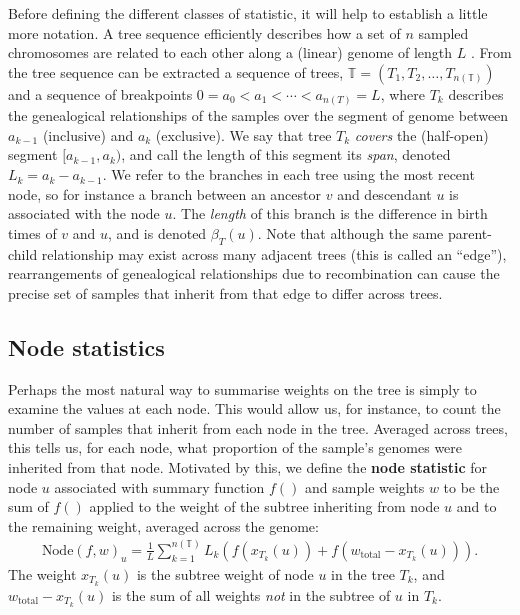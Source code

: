 \documentclass{article}
\newcommand{\node}{\mbox{Node}} %
\newcommand{\treeseq}{\mathbb{T}} %
\newcommand{\iw}{w} %
\newcommand{\tiw}{w_\text{total}} %
\newcommand{\nw}{x} %
\begin{document}
Before defining the different classes of statistic,
it will help to establish a little more notation.
A tree sequence efficiently describes how a set of $n$ sampled chromosomes
are related to each other along a (linear) genome of length $L$ \citep{kelleher2016efficient,kelleher2018efficient}.
From the tree sequence can be extracted a sequence of trees,
$\treeseq = (T_1, T_2, \ldots, T_{n(\treeseq)})$
and a sequence of breakpoints $0 = a_0 < a_1 < \cdots < a_{n(T)} = L$,
where $T_k$ describes the genealogical relationships of the samples
over the segment of genome between $a_{k-1}$ (inclusive) and $a_k$ (exclusive).
We say that tree $T_k$ \emph{covers} the (half-open) segment $[a_{k-1}, a_k)$,
and call the length of this segment its \emph{span}, denoted $L_k = a_k - a_{k-1}$.
We refer to the branches in each tree using the most recent node,
so for instance a branch between an ancestor $v$ and descendant $u$
is associated with the node $u$.
The \emph{length} of this branch is the difference in birth times of $v$ and $u$,
and is denoted $\beta_T(u)$.
Note that although the same parent-child relationship may exist across many adjacent trees
(this is called an ``edge''),
rearrangements of genealogical relationships due to recombination
can cause the precise set of samples that inherit from that edge to differ across trees.


\subsection*{Node statistics}

Perhaps the most natural way to summarise weights on the tree
is simply to examine the values at each node.
This would allow us, for instance, to
count the number of samples that inherit from each node in the tree.
Averaged across trees,
this tells us, for each node, what proportion of the sample's genomes were inherited from that node.
Motivated by this, we define the
\textbf{node statistic} for node $u$
associated with summary function $f()$ and sample weights $\iw$
to be the sum of $f()$ applied to the weight of the subtree inheriting from node $u$
and to the remaining weight,
averaged across the genome:
\begin{align}
    \node(f, \iw)_u
    =
    \frac{1}{L} \sum_{k=1}^{n(\treeseq)} L_k \left( f(\nw_{T_k}(u)) + f(\tiw - \nw_{T_k}(u)) \right).
\end{align}
The weight $\nw_{T_k}(u)$ is the subtree weight of node $u$ in the tree $T_k$,
and $\tiw - \nw_{T_k}(u)$ is the sum of all weights \emph{not} in the subtree of $u$ in $T_k$.
\end{document}
